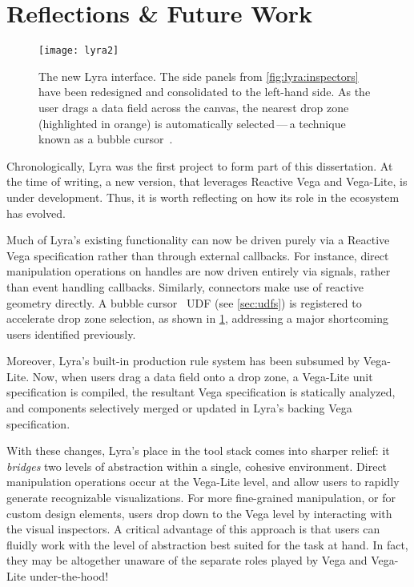 \section{Reflections \& Future Work}

\begin{figure}[b!]
\texttt{[image: lyra2]}
\caption{The new Lyra interface. The side panels from \cref{fig:lyra:inspectors}
have been redesigned and consolidated to the left-hand side. As the user drags a
data field across the canvas, the nearest drop zone (highlighted in orange) is
automatically selected\,---\,a technique known as a bubble
cursor~\cite{grossman:bubble}.}
\label{fig:lyra2}
\end{figure}

Chronologically, Lyra was the first project to form part of this dissertation.
At the time of writing, a new version, that leverages Reactive Vega and
Vega-Lite, is under development. Thus, it is worth reflecting on how its role in
the ecosystem has evolved.

Much of Lyra's existing functionality can now be driven purely via a Reactive
Vega specification rather than through external callbacks. For instance, direct
manipulation operations on handles are now driven entirely via signals, rather
than event handling callbacks. Similarly, connectors make use of reactive
geometry directly. A bubble cursor~\cite{grossman:bubble} UDF (see
\cref{sec:udfs}) is registered to accelerate drop zone selection, as shown in
\cref{fig:lyra2}, addressing a major shortcoming users identified previously.

Moreover, Lyra's built-in production rule system has been subsumed by Vega-Lite.
Now, when users drag a data field onto a drop zone, a Vega-Lite unit
specification is compiled, the resultant Vega specification is statically
analyzed, and components selectively merged or updated in Lyra's backing Vega
specification.

With these changes, Lyra's place in the tool stack comes into sharper relief: it
\emph{bridges} two levels of abstraction within a single, cohesive environment.
Direct manipulation operations occur at the Vega-Lite level, and allow users to
rapidly generate recognizable visualizations. For more fine-grained
manipulation, or for custom design elements, users drop down to the Vega level
by interacting with the visual inspectors. A critical advantage of this approach
is that users can fluidly work with the level of abstraction best suited for the
task at hand. In fact, they may be altogether unaware of the separate roles
played by Vega and Vega-Lite under-the-hood!

